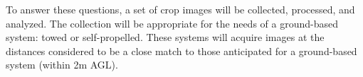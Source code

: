 \documentclass[letterpaper, notitlepage]{report}
\begin{document}
To answer these questions, a set of crop images will be collected, processed, and analyzed. The collection will be appropriate for the needs of a ground-based system: towed or self-propelled. These systems will acquire images at the distances considered to be a close match to those anticipated for a ground-based system (within 2m \gls{AGL}).



\end{document}
